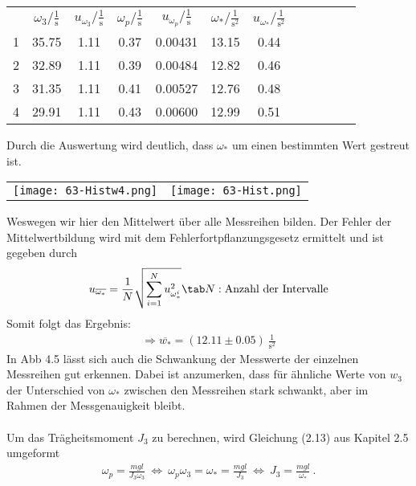\begin{center}
    \begin{tabular}{gccccccccccc}
         &      $\omega_3/\frac{1}{\text{s}}$ &  $u_{\omega_3}/\frac{1}{\text{s}}$ &    $\omega_p/\frac{1}{\text{s}}$ &     $u_{\omega_p}/\frac{1}{\text{s}}$ &     $\omega_*/\frac{1}{\text{s}^2}$&  $u_{\omega_*}/\frac{1}{\text{s}^2}$\\
        1 &  35.75 &  1.11 &  0.37 &  0.00431 &  13.15 &  0.44 \\
        2 &  32.89 &  1.11 &  0.39 &  0.00484 &  12.82 &  0.46 \\
        3 &  31.35 &  1.11 &  0.41 &  0.00527 &  12.76 &  0.48 \\
        4 &  29.91 &  1.11 &  0.43 &  0.00600 &  12.99 &  0.51 \\
    \end{tabular}
\end{center}
Durch die Auswertung wird deutlich, dass $\omega_*$ um einen bestimmten Wert gestreut ist. 
\begin{center}
    \begin{tabular}{c c}
        \texttt{[image: 63-Histw4.png]} & \texttt{[image: 63-Hist.png]}
    \end{tabular}
\end{center}
Weswegen wir hier den Mittelwert über alle Messreihen bilden. Der Fehler der Mittelwertbildung wird mit dem Fehlerfortpflanzungsgesetz ermittelt und ist gegeben durch
\begin{align}
    u_{\overline{\omega_*}}=\frac{1}{N}\sqrt{\sum_{i=1}^{N} u_{\omega_*^i}^2}\tab N:\text{Anzahl der Intervalle}
\end{align}
Somit folgt das Ergebnis:
\begin{align*}
    \Rightarrow\boxed{\overline{w_*}=(12.11 \pm 0.05)~\frac{1}{\text{s}^2}}
\end{align*}
In Abb 4.5 lässt sich auch die Schwankung der Messwerte der einzelnen Messreihen gut erkennen. Dabei ist anzumerken, dass für ähnliche Werte von $w_3$ der Unterschied von $\omega_*$ zwischen den Messreihen stark schwankt, aber im Rahmen der Messgenauigkeit bleibt.\\ \\
Um das Trägheitsmoment $J_3$ zu berechnen, wird Gleichung (2.13) aus Kapitel 2.5 umgeformt
\begin{align}
    \omega_p = \frac{mgl}{J_3\omega_3}~\Leftrightarrow~\omega_p\omega_3 = \omega_* = \frac{mgl}{J_3}~\Leftrightarrow~J_3 = \frac{mgl}{\omega_*}~.
\end{align}
